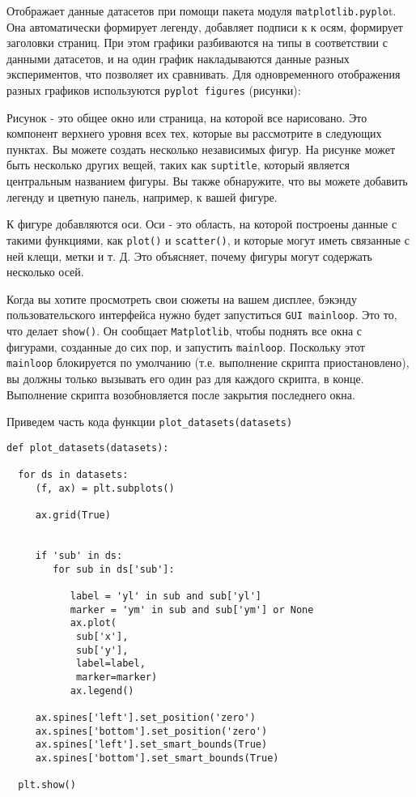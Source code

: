     Отображает данные датасетов при помощи пакета модуля \lstinline!matplotlib.pyplo!t. Она автоматически формирует легенду, добавляет подписи к к осям, формирует заголовки страниц. При этом графики разбиваются на типы в соответствии с данными датасетов, и на один график накладываются данные разных экспериментов, что позволяет их сравнивать. Для одновременного отображения разных графиков используются \lstinline!pyplot figures! (рисунки):

Рисунок - это общее окно или страница, на которой все нарисовано. Это компонент верхнего уровня всех тех, которые вы рассмотрите в следующих пунктах. Вы можете создать несколько независимых фигур. На рисунке может быть несколько других вещей, таких как \lstinline!suptitle!, который является центральным названием фигуры. Вы также обнаружите, что вы можете добавить легенду и цветную панель, например, к вашей фигуре.

К фигуре добавляются оси. Оси - это область, на которой построены данные с такими функциями, как \lstinline!plot()! и \lstinline!scatter()!, и которые могут иметь связанные с ней клещи, метки и т. Д. Это объясняет, почему фигуры могут содержать несколько осей.

Когда вы хотите просмотреть свои сюжеты на вашем дисплее, бэкэнду пользовательского интерфейса нужно будет запуститься \lstinline!GUI mainloop!. Это то, что делает \lstinline!show()!. Он сообщает \lstinline!Matplotlib!, чтобы поднять все окна с фигурами, созданные до сих пор, и запустить \lstinline!mainloop!. Поскольку этот \lstinline!mainloop! блокируется по умолчанию (т.е. выполнение скрипта приостановлено), вы должны только вызывать его один раз для каждого скрипта, в конце. Выполнение скрипта возобновляется после закрытия последнего окна.

Приведем часть кода функции \lstinline!plot_datasets(datasets)!

\begin{lstlisting}[style=pythonstyle,caption={  }, label=lst:func:1]
def plot_datasets(datasets):

  for ds in datasets:
     (f, ax) = plt.subplots()

     ax.grid(True)


     if 'sub' in ds:
        for sub in ds['sub']:

           label = 'yl' in sub and sub['yl']
           marker = 'ym' in sub and sub['ym'] or None
           ax.plot(
           	sub['x'], 
           	sub['y'], 
           	label=label, 
           	marker=marker)
           ax.legend()

     ax.spines['left'].set_position('zero')
     ax.spines['bottom'].set_position('zero')
     ax.spines['left'].set_smart_bounds(True)
     ax.spines['bottom'].set_smart_bounds(True)

  plt.show()
\end{lstlisting}

